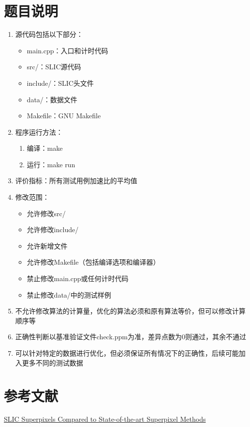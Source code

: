 \documentclass{ctexart}
\begin{document}
\section{题目说明}
\begin{enumerate}
    \item 源代码包括以下部分：
    \begin{itemize}
        \item main.cpp：入口和计时代码
        \item src/：SLIC源代码
        \item include/：SLIC头文件
        \item data/：数据文件
        \item Makefile：GNU Makefile
    \end{itemize}
    \item 程序运行方法：
    \begin{enumerate}
        \item 编译：make
        \item 运行：make run
    \end{enumerate}
    \item 评价指标：所有测试用例加速比的平均值
    \item 修改范围：
    \begin{itemize}
        \item 允许修改src/
        \item 允许修改include/
        \item 允许新增文件
        \item 允许修改Makefile（包括编译选项和编译器）
        \item 禁止修改main.cpp或任何计时代码
        \item 禁止修改data/中的测试样例
    \end{itemize}
    \item 不允许修改算法的计算量，优化的算法必须和原有算法等价，但可以修改计算顺序等
    \item 正确性判断以基准验证文件check.ppm为准，差异点数为0则通过，其余不通过
    \item 可以针对特定的数据进行优化，但必须保证所有情况下的正确性，后续可能加入更多不同的测试数据
\end{enumerate}

\section{参考文献}

\href{https://core.ac.uk/download/pdf/147983593.pdf}{SLIC Superpixels Compared to State-of-the-art
Superpixel Methods}
\end{document}
